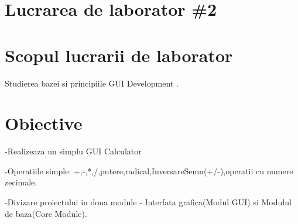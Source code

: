 
\section*{Lucrarea de laborator \#2}




\section{Scopul lucrarii de laborator}

Studierea bazei si principiile GUI Development  .

\section{Obiective}



 -Realizeaza un simplu GUI Calculator

-Operatiile simple: +,-,*,/,putere,radical,InversareSemn(+/-),operatii cu numere zecimale.

-Divizare proiectului in doua module - Interfata grafica(Modul GUI) si Modulul de baza(Core Module).
       
